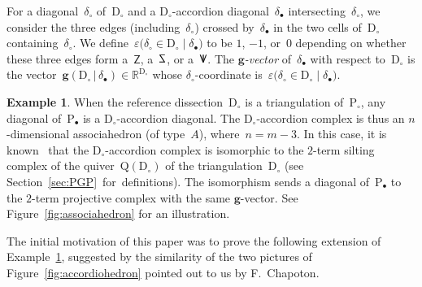 \documentclass{amsart}
\theoremstyle{definition}
\newtheorem{example}[theorem]{Example}
\newcommand{\R}{\mathbb{R}} %
\renewcommand{\b}[1]{\mathbf{#1}} %
\newcommand{\bigset}[2]{\big\{ #1 \;\big|\; #2 \big\}} %
\newcommand{\eqdef}{\mbox{\,\raisebox{0.2ex}{\scriptsize\ensuremath{\mathrm:}}\ensuremath{=}\,}} %
\newcommand{\fref}[1]{Figure~\ref{#1}} %
\newcommand{\darkblue}{\color{darkblue}} %
\newcommand{\defn}[1]{\textsl{\darkblue #1}} %
\newcommand{\polygon}{\mathrm{P}} %
\newcommand{\dissection}{\mathrm{D}} %
\newcommand{\sign}[3]{\varepsilon \big( {#1} \in {#2}\;|\;{#3} \big)} %
\newcommand{\SSS}{\reflectbox{$\mathsf{Z}$}} %
\newcommand{\ZZZ}{\mathsf{Z}} %
\newcommand{\VVV}{{\mathsf{{V \hspace{-.1686cm} I\,}}}} %
\newcommand{\gvector}[2]{\mathbf{g}(#1 \,|\, #2)} %
\newcommand{\biggvectors}[2]{\mathbf{g} \big( #1 \,|\, #2 \big)} %
\newcommand{\quiver}{\mathrm{Q}} %
\begin{document}

For a diagonal~$\delta_\circ$ of~$\dissection_\circ$ and a $\dissection_\circ$-accordion diagonal~$\delta_\bullet$ intersecting~$\delta_\circ$, we consider the three edges (including~$\delta_\circ$) crossed by~$\delta_\bullet$ in the two cells of~$\dissection_\circ$ containing~$\delta_\circ$. We define~$\sign{\delta_\circ}{\dissection_\circ}{\delta_\bullet}$ to be $1$, $-1$, or~$0$ depending on whether these three edges form a~$\ZZZ$, a~$\SSS$, or a~$\VVV$.
The \defn{$\b{g}$-vector} of~$\delta_\bullet$ with respect to~$\dissection_\circ$ is the vector~$\gvector{\dissection_\circ}{\delta_\bullet} \in \R^{\dissection_\circ}$ whose $\delta_\circ$-coordinate is~$\sign{\delta_\circ}{\dissection_\circ}{\delta_\bullet}$.

\begin{example}
\label{exm:associahedron}
When the reference dissection~$\dissection_\circ$ is a triangulation of~$\polygon_\circ$, any diagonal of~$\polygon_\bullet$ is a $\dissection_\circ$-accordion diagonal.
The $\dissection_\circ$-accordion complex is thus an $n$-dimensional associahedron (of type~$A$), where~$n = m-3$.
In this case, it is known~\cite{??} that the $\dissection_\circ$-accordion complex is isomorphic to the $2$-term silting complex of the quiver~$\quiver(\dissection_\circ)$ of the triangulation~$\dissection_\circ$ (see Section~\ref{sec:PGP}~for~definitions).
The isomorphism sends a diagonal of~$\polygon_\bullet$ to the $2$-term projective complex with the same $\b{g}$-vector.
See \fref{fig:associahedron} for an illustration.
\end{example}

The initial motivation of this paper was to prove the following extension of Example~\ref{exm:associahedron}, suggested by the similarity of the two pictures of \fref{fig:accordiohedron} pointed out to us by F.~Chapoton.
\end{document}
